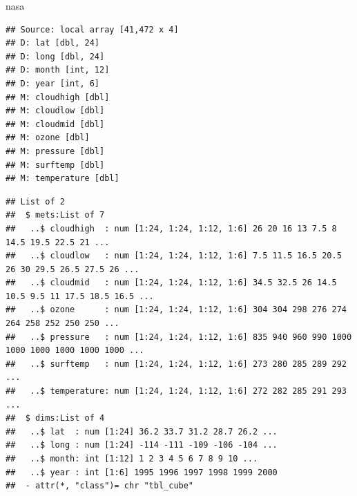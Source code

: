 \documentclass[]{article}
\newenvironment{Shaded}{\begin{snugshade}}{\end{snugshade}}
\newcommand{\DataTypeTok}[1]{\textcolor[rgb]{0.13,0.29,0.53}{#1}}
\newcommand{\KeywordTok}[1]{\textcolor[rgb]{0.13,0.29,0.53}{\textbf{#1}}}
\newcommand{\NormalTok}[1]{#1}
\newcommand{\OperatorTok}[1]{\textcolor[rgb]{0.81,0.36,0.00}{\textbf{#1}}}
\newcommand{\StringTok}[1]{\textcolor[rgb]{0.31,0.60,0.02}{#1}}
\begin{document}
\begin{Shaded}
\begin{Highlighting}[]
\NormalTok{nasa}
\end{Highlighting}
\end{Shaded}

\begin{verbatim}
## Source: local array [41,472 x 4]
## D: lat [dbl, 24]
## D: long [dbl, 24]
## D: month [int, 12]
## D: year [int, 6]
## M: cloudhigh [dbl]
## M: cloudlow [dbl]
## M: cloudmid [dbl]
## M: ozone [dbl]
## M: pressure [dbl]
## M: surftemp [dbl]
## M: temperature [dbl]
\end{verbatim}

\begin{Shaded}
\end{Shaded}

\begin{verbatim}
## List of 2
##  $ mets:List of 7
##   ..$ cloudhigh  : num [1:24, 1:24, 1:12, 1:6] 26 20 16 13 7.5 8 14.5 19.5 22.5 21 ...
##   ..$ cloudlow   : num [1:24, 1:24, 1:12, 1:6] 7.5 11.5 16.5 20.5 26 30 29.5 26.5 27.5 26 ...
##   ..$ cloudmid   : num [1:24, 1:24, 1:12, 1:6] 34.5 32.5 26 14.5 10.5 9.5 11 17.5 18.5 16.5 ...
##   ..$ ozone      : num [1:24, 1:24, 1:12, 1:6] 304 304 298 276 274 264 258 252 250 250 ...
##   ..$ pressure   : num [1:24, 1:24, 1:12, 1:6] 835 940 960 990 1000 1000 1000 1000 1000 1000 ...
##   ..$ surftemp   : num [1:24, 1:24, 1:12, 1:6] 273 280 285 289 292 ...
##   ..$ temperature: num [1:24, 1:24, 1:12, 1:6] 272 282 285 291 293 ...
##  $ dims:List of 4
##   ..$ lat  : num [1:24] 36.2 33.7 31.2 28.7 26.2 ...
##   ..$ long : num [1:24] -114 -111 -109 -106 -104 ...
##   ..$ month: int [1:12] 1 2 3 4 5 6 7 8 9 10 ...
##   ..$ year : int [1:6] 1995 1996 1997 1998 1999 2000
##  - attr(*, "class")= chr "tbl_cube"
\end{verbatim}

\begin{Shaded}
\end{Shaded}
\end{document}
